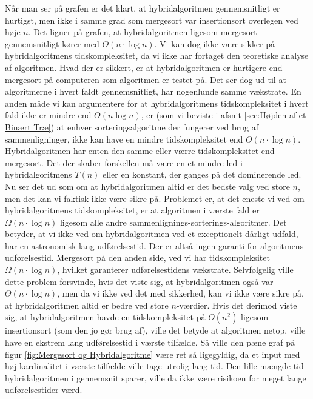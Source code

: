 Når man ser på grafen er det klart, at hybridalgoritmen gennemsnitligt er hurtigst, men ikke i samme grad som mergesort var insertionsort overlegen ved høje $n$. Det ligner på grafen, at hybridalgoritmen ligesom mergesort gennemsnitligt kører med $\Theta (n \cdot \log n)$. Vi kan dog ikke være sikker på hybridalgoritmens tidskompleksitet, da vi ikke har fortaget den teoretiske analyse af algoritmen. Hvad der er sikkert, er at hybridalgoritmen er hurtigere end mergesort på computeren som algoritmen er testet på. Det ser dog ud til at algoritmerne i hvert faldt gennemsnitligt, har nogenlunde samme vækstrate. En anden måde vi kan argumentere for at hybridalgoritmens tidskompleksitet i hvert fald ikke er mindre end $O(n \log n)$, er (som vi beviste i afsnit \ref{sec:Højden af et Binært Træ}) at enhver sorteringsalgoritme der fungerer ved brug af sammenligninger, ikke kan have en mindre tidskompleksitet end $O(n \cdot \log n)$. Hybridalgoritmen har enten den samme eller værre tidskompleksitet end mergesort. Det der skaber forskellen må være en et mindre led i hybridalgoritmens $T(n)$ eller en konstant, der ganges på det dominerende led.\\

Nu ser det ud som om at hybridalgoritmen altid er det bedste valg ved store $n$, men det kan vi faktisk ikke være sikre på. Problemet er, at det eneste vi ved om hybridalgoritmens tidskompleksitet, er at algoritmen i værste fald er $\Omega (n \cdot \log n)$ ligesom alle andre sammenlignings-sorterings-algoritmer. Det betyder, at vi ikke ved om hybridalgoritmen ved et exceptionelt dårligt udfald, har en astronomisk lang udførelsestid. Der er altså ingen garanti for algoritmens udførelsestid. Mergesort på den anden side, ved vi har tidskompleksitet $\Omega (n \cdot \log n)$, hvilket garanterer udførelsestidens vækstrate. Selvfølgelig ville dette problem forsvinde, hvis det viste sig, at hybridalgoritmen også var $\Theta (n \cdot \log n)$, men da vi ikke ved det med sikkerhed, kan vi ikke være sikre på, at hybridalgoritmen altid er bedre ved store $n$-værdier. Hvis det derimod viste sig, at hybridalgoritmen havde en tidskompleksitet på $O(n^2)$ ligesom insertionsort (som den jo gør brug af), ville det betyde at algoritmen netop, ville have en ekstrem lang udførelsestid i værste tilfælde. Så ville den pæne graf på figur \ref{fig:Mergesort og Hybridalgoritme} være ret så ligegyldig, da et input med høj kardinalitet i værste tilfælde ville tage utrolig lang tid. Den lille mængde tid hybridalgoritmen i gennemsnit sparer, ville da ikke være risikoen for meget lange udførelsestider værd.

